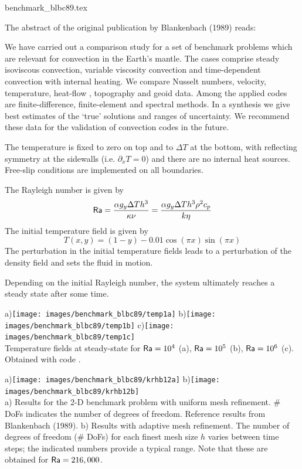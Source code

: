 \begin{flushright} {\tiny {\color{gray} benchmark\_blbc89.tex}} \end{flushright}

The abstract of the original publication by Blankenbach \etal (1989) \cite{blbc89} reads:
\begin{displayquote}
{\color{darkgray}
We have carried out a comparison study for a set of benchmark problems 
which are relevant for convection in the Earth's mantle. The cases comprise 
steady isoviscous convection, variable viscosity convection and time-dependent 
convection with internal heating. We compare Nusselt numbers, velocity, 
temperature, heat-flow , topography and geoid data. Among the applied codes 
are finite-difference, finite-element and spectral methods. In a synthesis 
we give best estimates of the `true' solutions and ranges of uncertainty. We
recommend these data for the validation of convection codes in the future.
}
\end{displayquote}

The temperature is fixed to zero on top and to $\Delta T$ at the bottom, 
with reflecting symmetry at the sidewalls (i.e. $\partial_x T=0$) 
and there are no internal heat sources. 
Free-slip conditions are implemented on all boundaries. 

The Rayleigh number is given by
\[
{\mathsf{Ra}} = \frac{\alpha g_y \Delta T h^3 }{\kappa \nu}
=\frac{\alpha g_y \Delta T h^3 \rho^2 c_p}{k \eta}
\]
The initial temperature field is given by 
\[
T(x,y)=(1-y) - 0.01\cos(\pi x) \sin(\pi x)
\]
The perturbation in the initial temperature fields leads to 
a perturbation of the density field and sets the fluid in motion. 

Depending on the initial Rayleigh number, the system ultimately reaches a 
steady state after some time. 

\begin{center}
a)\texttt{[image: images/benchmark\_blbc89/temp1a]}
b)\texttt{[image: images/benchmark\_blbc89/temp1b]}
c)\texttt{[image: images/benchmark\_blbc89/temp1c]}\\
{\captionfont Temperature fields at steady-state for 
${\mathsf{Ra}}=10^4$ (a), ${\mathsf{Ra}}=10^5$ (b), ${\mathsf{Ra}}=10^6$ (c).
Obtained with \elefant code \cite{thie14}.}
\end{center}


\begin{center}
a)\texttt{[image: images/benchmark\_blbc89/krhb12a]}
b)\texttt{[image: images/benchmark\_blbc89/krhb12b]}\\
{\captionfont 
a) Results for the 2-D benchmark problem with uniform mesh refinement. 
\# DoFs indicates the number of degrees of freedom.
Reference results from Blankenbach \etal (1989).
b) Results with adaptive mesh refinement. The number of degrees of freedom (\# DoFs) for
each finest mesh size $h$ varies between time steps; 
the indicated numbers provide a typical range.
Note that these are obtained for ${\mathsf{Ra}}=216,000$.}
\end{center}

